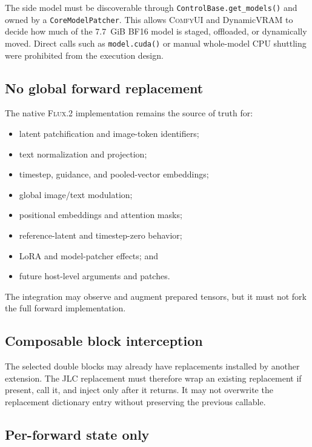 \documentclass[11pt]{article}
\newcommand{\FluxTwo}{\textsc{Flux.2}}
\newcommand{\ComfyUI}{\textsc{ComfyUI}}
\newcommand{\JLC}{\textsc{JLC}}
\newcommand{\code}[1]{\texttt{#1}}
\begin{document}
The side model must be discoverable through \code{ControlBase.get\_models()} and owned by a \code{CoreModelPatcher}. This allows \ComfyUI{} and DynamicVRAM to decide how much of the 7.7~GiB BF16 model is staged, offloaded, or dynamically moved. Direct calls such as \code{model.cuda()} or manual whole-model CPU shuttling were prohibited from the execution design.

\subsection{No global forward replacement}

The native \FluxTwo{} implementation remains the source of truth for:

\begin{itemize}
  \item latent patchification and image-token identifiers;
  \item text normalization and projection;
  \item timestep, guidance, and pooled-vector embeddings;
  \item global image/text modulation;
  \item positional embeddings and attention masks;
  \item reference-latent and timestep-zero behavior;
  \item LoRA and model-patcher effects; and
  \item future host-level arguments and patches.
\end{itemize}

The integration may observe and augment prepared tensors, but it must not fork the full forward implementation.

\subsection{Composable block interception}

The selected double blocks may already have replacements installed by another extension. The \JLC{} replacement must therefore wrap an existing replacement if present, call it, and inject only after it returns. It may not overwrite the replacement dictionary entry without preserving the previous callable.

\subsection{Per-forward state only}
\end{document}
